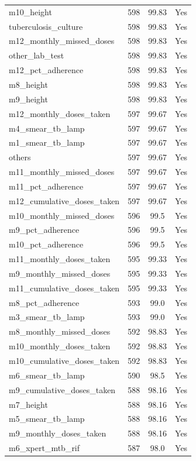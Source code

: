 \documentclass[12pt]{article}
\begin{document}
\begin{longtable}[l]{>{\raggedright\arraybackslash}p{}cc>{\centering\arraybackslash}p{}}
m10\_height & 598 & 99.83 & Yes \\
tuberculosis\_culture & 598 & 99.83 & Yes \\
m12\_monthly\_missed\_doses & 598 & 99.83 & Yes \\
other\_lab\_test & 598 & 99.83 & Yes \\
m12\_pct\_adherence & 598 & 99.83 & Yes \\
m8\_height & 598 & 99.83 & Yes \\
m9\_height & 598 & 99.83 & Yes \\
m12\_monthly\_doses\_taken & 597 & 99.67 & Yes \\
m4\_smear\_tb\_lamp & 597 & 99.67 & Yes \\
m1\_smear\_tb\_lamp & 597 & 99.67 & Yes \\
others & 597 & 99.67 & Yes \\
m11\_monthly\_missed\_doses & 597 & 99.67 & Yes \\
m11\_pct\_adherence & 597 & 99.67 & Yes \\
m12\_cumulative\_doses\_taken & 597 & 99.67 & Yes \\
m10\_monthly\_missed\_doses & 596 & 99.5 & Yes \\
m9\_pct\_adherence & 596 & 99.5 & Yes \\
m10\_pct\_adherence & 596 & 99.5 & Yes \\
m11\_monthly\_doses\_taken & 595 & 99.33 & Yes \\
m9\_monthly\_missed\_doses & 595 & 99.33 & Yes \\
m11\_cumulative\_doses\_taken & 595 & 99.33 & Yes \\
m8\_pct\_adherence & 593 & 99.0 & Yes \\
m3\_smear\_tb\_lamp & 593 & 99.0 & Yes \\
m8\_monthly\_missed\_doses & 592 & 98.83 & Yes \\
m10\_monthly\_doses\_taken & 592 & 98.83 & Yes \\
m10\_cumulative\_doses\_taken & 592 & 98.83 & Yes \\
m6\_smear\_tb\_lamp & 590 & 98.5 & Yes \\
m9\_cumulative\_doses\_taken & 588 & 98.16 & Yes \\
m7\_height & 588 & 98.16 & Yes \\
m5\_smear\_tb\_lamp & 588 & 98.16 & Yes \\
m9\_monthly\_doses\_taken & 588 & 98.16 & Yes \\
m6\_xpert\_mtb\_rif & 587 & 98.0 & Yes \\

\end{longtable}
\end{document}
